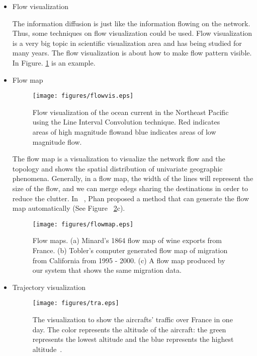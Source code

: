 \begin{itemize}
\item Flow visualization

The information diffusion is just like the information flowing on the network. Thus, some techniques on flow visualization could be used. Flow visualization is a very big topic in scientific visualization
area and has being studied for many years. The flow visualization is about how to make flow pattern visible. In Figure. \ref{fig:flowvis} is an example.

\item Flow map
\begin{figure}[!htb]
  \centering
  \texttt{[image: figures/flowvis.eps]}
  \caption{Flow visualization of the ocean current in the Northeast Pacific using the Line Interval Convolution technique. Red indicates areas of high magnitude flowand blue indicates areas of low magnitude flow.~\cite{moorhead1995signal}}
  \label{fig:flowvis}
\end{figure}

The flow map is a visualization to visualize the network flow and the topology and shows the spatial distribution of univariate geographic phenomena. Generally, in a flow map, the width of the lines will represent the size of the flow, and we can merge edegs sharing the destinations in order to reduce the clutter. In ~\cite{phan2005flow}, Phan proposed a method that can generate the flow map automatically (See Figure ~\ref{fig:flowmap}c).

\begin{figure}[!htb]
  \centering
  \texttt{[image: figures/flowmap.eps]}
  \caption{Flow maps. (a) Minard’s 1864 flow map of wine exports from France. (b) Tobler’s computer generated flow map of migration from California from 1995 - 2000. (c) A flow map produced by our system that shows the same migration data.~\cite{phan2005flow}}
  \label{fig:flowmap}
\end{figure}

\item Trajectory visualization
\begin{figure}[!htb]
  \centering
  \texttt{[image: figures/tra.eps]}
  \caption{The visualization to show the aircrafts' traffic over France in one day. The color represents the altitude of the aircraft: the green represents the lowest altitude and the blue represents the highest altitude~\cite{hurter2009fromdady}.}
  \label{fig:tra}
\end{figure}


\end{itemize}
